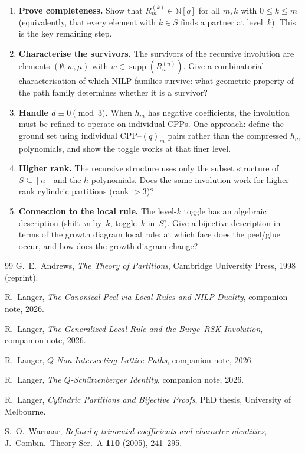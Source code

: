 \documentclass[11pt]{article}
\newcommand{\N}{\mathbb{N}}
\DeclareMathOperator{\supp}{supp}
\theoremstyle{plain}
\theoremstyle{definition}
\begin{document}
\begin{enumerate}
  \item \textbf{Prove completeness.}\;
    Show that $R_m^{(k)} \in \N[q]$ for all $m, k$ with
    $0 \leq k \leq m$ (equivalently, that every element
    with $k \in S$ finds a partner at level~$k$).  This
    is the key remaining step.

  \item \textbf{Characterise the survivors.}\;
    The survivors of the recursive involution are elements
    $(\emptyset, w, \mu)$ with $w \in \supp(R_n^{(n)})$.
    Give a combinatorial characterisation of which NILP
    families survive: what geometric property of the path
    family determines whether it is a survivor?

  \item \textbf{Handle $d \equiv 0 \pmod{3}$.}\;
    When $h_m$ has negative coefficients, the involution
    must be refined to operate on individual CPPs.
    One approach: define the ground set using individual
    CPP--$(q)_m$ pairs rather than the compressed
    $h_m$ polynomials, and show the toggle works at that
    finer level.

  \item \textbf{Higher rank.}\;
    The recursive structure uses only the subset
    structure of $S \subseteq [n]$ and the $h$-polynomials.
    Does the same involution work for higher-rank cylindric
    partitions (rank $> 3$)?

  \item \textbf{Connection to the local rule.}\;
    The level-$k$ toggle has an algebraic description
    (shift~$w$ by~$k$, toggle~$k$ in~$S$).  Give a
    bijective description in terms of the growth
    diagram local rule: at which face does the peel/glue
    occur, and how does the growth diagram change?
\end{enumerate}


\begin{thebibliography}{99}
  G.~E.~Andrews,
  \emph{The Theory of Partitions},
  Cambridge University Press, 1998 (reprint).

  R.~Langer,
  \emph{The Canonical Peel via Local Rules and NILP
  Duality},
  companion note, 2026.

  R.~Langer,
  \emph{The Generalized Local Rule and the Burge--RSK
  Involution},
  companion note, 2026.

  R.~Langer,
  \emph{$Q$-Non-Intersecting Lattice Paths},
  companion note, 2026.

  R.~Langer,
  \emph{The $Q$-Sch\"utzenberger Identity},
  companion note, 2026.

  R.~Langer,
  \emph{Cylindric Partitions and Bijective Proofs},
  PhD thesis, University of Melbourne.

  S.~O.~Warnaar,
  \emph{Refined $q$-trinomial coefficients and character
  identities},
  J.~Combin.\ Theory Ser.~A \textbf{110} (2005), 241--295.
\end{thebibliography}
\end{document}

